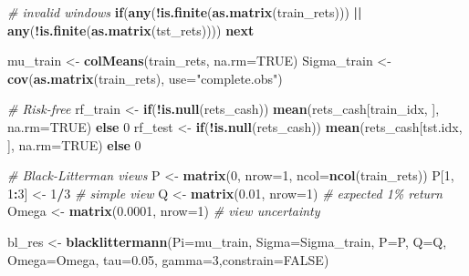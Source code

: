 \documentclass[
  12pt,
]{article}
\newenvironment{Shaded}{\begin{snugshade}}{\end{snugshade}}
\newcommand{\AttributeTok}[1]{\textcolor[rgb]{0.13,0.29,0.53}{#1}}
\newcommand{\CommentTok}[1]{\textcolor[rgb]{0.56,0.35,0.01}{\textit{#1}}}
\newcommand{\ConstantTok}[1]{\textcolor[rgb]{0.56,0.35,0.01}{#1}}
\newcommand{\ControlFlowTok}[1]{\textcolor[rgb]{0.13,0.29,0.53}{\textbf{#1}}}
\newcommand{\DecValTok}[1]{\textcolor[rgb]{0.00,0.00,0.81}{#1}}
\newcommand{\FloatTok}[1]{\textcolor[rgb]{0.00,0.00,0.81}{#1}}
\newcommand{\FunctionTok}[1]{\textcolor[rgb]{0.13,0.29,0.53}{\textbf{#1}}}
\newcommand{\NormalTok}[1]{#1}
\newcommand{\OtherTok}[1]{\textcolor[rgb]{0.56,0.35,0.01}{#1}}
\newcommand{\SpecialCharTok}[1]{\textcolor[rgb]{0.81,0.36,0.00}{\textbf{#1}}}
\newcommand{\StringTok}[1]{\textcolor[rgb]{0.31,0.60,0.02}{#1}}
\begin{document}
\begin{Shaded}
\begin{Highlighting}[]
  \CommentTok{\# invalid windows}
  \ControlFlowTok{if}\NormalTok{(}\FunctionTok{any}\NormalTok{(}\SpecialCharTok{!}\FunctionTok{is.finite}\NormalTok{(}\FunctionTok{as.matrix}\NormalTok{(train\_rets))) }\SpecialCharTok{||} \FunctionTok{any}\NormalTok{(}\SpecialCharTok{!}\FunctionTok{is.finite}\NormalTok{(}\FunctionTok{as.matrix}\NormalTok{(tst\_rets)))) }\ControlFlowTok{next}
  
\NormalTok{  mu\_train    }\OtherTok{\textless{}{-}} \FunctionTok{colMeans}\NormalTok{(train\_rets, }\AttributeTok{na.rm=}\ConstantTok{TRUE}\NormalTok{)}
\NormalTok{  Sigma\_train }\OtherTok{\textless{}{-}} \FunctionTok{cov}\NormalTok{(}\FunctionTok{as.matrix}\NormalTok{(train\_rets), }\AttributeTok{use=}\StringTok{"complete.obs"}\NormalTok{)}
  
  \CommentTok{\# Risk{-}free}
\NormalTok{  rf\_train }\OtherTok{\textless{}{-}} \ControlFlowTok{if}\NormalTok{(}\SpecialCharTok{!}\FunctionTok{is.null}\NormalTok{(rets\_cash)) }\FunctionTok{mean}\NormalTok{(rets\_cash[train\_idx, ], }\AttributeTok{na.rm=}\ConstantTok{TRUE}\NormalTok{) }\ControlFlowTok{else} \DecValTok{0}
\NormalTok{  rf\_test  }\OtherTok{\textless{}{-}} \ControlFlowTok{if}\NormalTok{(}\SpecialCharTok{!}\FunctionTok{is.null}\NormalTok{(rets\_cash)) }\FunctionTok{mean}\NormalTok{(rets\_cash[tst.idx, ], }\AttributeTok{na.rm=}\ConstantTok{TRUE}\NormalTok{) }\ControlFlowTok{else} \DecValTok{0}
  
  \CommentTok{\# Black{-}Litterman views}
\NormalTok{  P }\OtherTok{\textless{}{-}} \FunctionTok{matrix}\NormalTok{(}\DecValTok{0}\NormalTok{, }\AttributeTok{nrow=}\DecValTok{1}\NormalTok{, }\AttributeTok{ncol=}\FunctionTok{ncol}\NormalTok{(train\_rets))}
\NormalTok{  P[}\DecValTok{1}\NormalTok{, }\DecValTok{1}\SpecialCharTok{:}\DecValTok{3}\NormalTok{] }\OtherTok{\textless{}{-}} \DecValTok{1}\SpecialCharTok{/}\DecValTok{3}       \CommentTok{\# simple view}
\NormalTok{  Q }\OtherTok{\textless{}{-}} \FunctionTok{matrix}\NormalTok{(}\FloatTok{0.01}\NormalTok{, }\AttributeTok{nrow=}\DecValTok{1}\NormalTok{) }\CommentTok{\# expected 1\% return}
\NormalTok{  Omega }\OtherTok{\textless{}{-}} \FunctionTok{matrix}\NormalTok{(}\FloatTok{0.0001}\NormalTok{, }\AttributeTok{nrow=}\DecValTok{1}\NormalTok{) }\CommentTok{\# view uncertainty}
  
\NormalTok{  bl\_res }\OtherTok{\textless{}{-}} \FunctionTok{blacklittermann}\NormalTok{(}\AttributeTok{Pi=}\NormalTok{mu\_train, }\AttributeTok{Sigma=}\NormalTok{Sigma\_train, }\AttributeTok{P=}\NormalTok{P, }\AttributeTok{Q=}\NormalTok{Q, }\AttributeTok{Omega=}\NormalTok{Omega, }\AttributeTok{tau=}\FloatTok{0.05}\NormalTok{, }\AttributeTok{gamma=}\DecValTok{3}\NormalTok{,}\AttributeTok{constrain=}\ConstantTok{FALSE}\NormalTok{)}
  

\end{Highlighting}
\end{Shaded}
\end{document}
